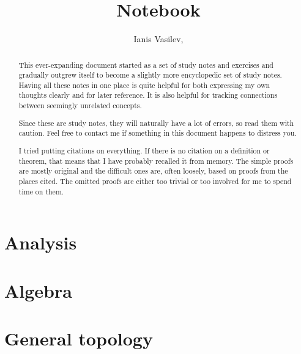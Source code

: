 \documentclass{scrartcl}
\title{Notebook}
\subtitle{\URL{https://github.com/v--/notebook}}
\author{Ianis Vasilev, \Email{ianis@ivasilev.net}}
\date{}
\begin{document}
\hfuzz=3pt
\maketitle

\begin{abstract}
  This ever-expanding document started as a set of study notes and exercises and gradually outgrew itself to become a slightly more encyclopedic set of study notes. Having all these notes in one place is quite helpful for both expressing my own thoughts clearly and for later reference. It is also helpful for tracking connections between seemingly unrelated concepts.

  Since these are study notes, they will naturally have a lot of errors, so read them with caution. Feel free to contact me if something in this document happens to distress you.

  I tried putting citations on everything. If there is no citation on a definition or theorem, that means that I have probably recalled it from memory. The simple proofs are mostly original and the difficult ones are, often loosely, based on proofs from the places cited. The omitted proofs are either too trivial or too involved for me to spend time on them.
\end{abstract}

\newpage
\tableofcontents
\newpage

\section{Analysis}\label{sec:analysis}











\section{Algebra}\label{sec:algebra}






\section{General topology}\label{sec:general_topology}







\end{document}
